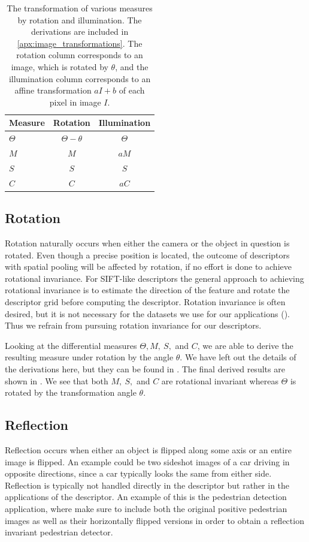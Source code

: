 \documentclass[thesis.tex]{subfiles}
\begin{document}
\begin{table}[tb]
	\centering
	\begin{tabular}{l c c}
	\toprule
	Measure & Rotation & Illumination \\
	\midrule
	$\Theta$ & $\Theta - \theta $ & $\Theta$ \\
	$M$ & $M$ & $a M$ \\
	$S$ & $S$ & $S$ \\
	$C$ & $C$ & $a C$ \\
	\bottomrule
	\end{tabular}
	\caption{The transformation of various measures by rotation and illumination. The derivations are included in \cref{apx:image_transformations}. The rotation column corresponds to an image, which is rotated by $\theta$, and the illumination column corresponds to an affine transformation $aI+b$ of each pixel in image $I$.}
	\label{tbl:measureInvariances}
\end{table}

\subsection{Rotation}
Rotation naturally occurs when either the camera or the object in question is rotated. Even though a precise position is located, the outcome of descriptors with spatial pooling will be affected by rotation, if no effort is done to achieve rotational invariance. For SIFT-like descriptors the general approach to achieving rotational invariance is to estimate the direction of the feature and rotate the descriptor grid before computing the descriptor. Rotation invariance is often desired, but it is not necessary for the datasets we use for our applications (). Thus we refrain from pursuing rotation invariance for our descriptors.

Looking at the differential measures $\Theta, M,~S,$ and $C$, we are able to derive the resulting measure under rotation by the angle $\theta$. We have left out the details of the derivations here, but they can be found in . The final derived results are shown in . We see that both $M,~S,$ and $C$ are rotational invariant whereas $\Theta$ is rotated by the transformation angle $\theta$.
%
\subsection{Reflection}
Reflection occurs when either an object is flipped along some axis or an entire image is flipped. An example could be two sideshot images of a car driving in opposite directions, since a car typically looks the same from either side. Reflection is typically not handled directly in the descriptor but rather in the applications of the descriptor. An example of this is the pedestrian detection application, where \cite{dalal2005histograms} make sure to include both the original positive pedestrian images as well as their horizontally flipped versions in order to obtain a reflection invariant pedestrian detector.
\end{document}
